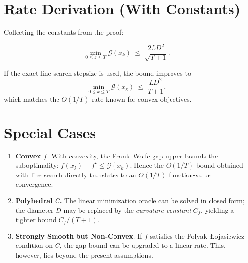 \documentclass{article}
\newcommand{\gap}{\mathcal{G}}
\begin{document}
\section*{Rate Derivation (With Constants)}
Collecting the constants from the proof:

\[
\boxed{
\min_{0\le k\le T}\gap(x_k) \;\le\;
\frac{2L D^{2}}{\sqrt{T+1}} } .
\]

If the exact line‑search stepsize is used, the bound improves to
\[
\min_{0\le k\le T}\gap(x_k) \;\le\;
\frac{L D^{2}}{T+1},
\]
which matches the $O(1/T)$ rate known for convex objectives.

\section*{Special Cases}
\begin{enumerate}[label=\alph*)]
\item \textbf{Convex $f$.}  With convexity, the Frank–Wolfe gap upper‑bounds the suboptimality: $f(x_k)-f^{\star}\le\gap(x_k)$.  Hence the $O(1/T)$ bound obtained with line search directly translates to an $O(1/T)$ function‑value convergence.
\item \textbf{Polyhedral $C$.}  The linear minimization oracle can be solved in closed form; the diameter $D$ may be replaced by the \emph{curvature constant} $C_f$, yielding a tighter bound $C_f/(T+1)$.
\item \textbf{Strongly Smooth but Non‑Convex.}  If $f$ satisfies the Polyak–Łojasiewicz condition on $C$, the gap bound can be upgraded to a linear rate.  This, however, lies beyond the present assumptions.
\end{enumerate}
\end{document}
